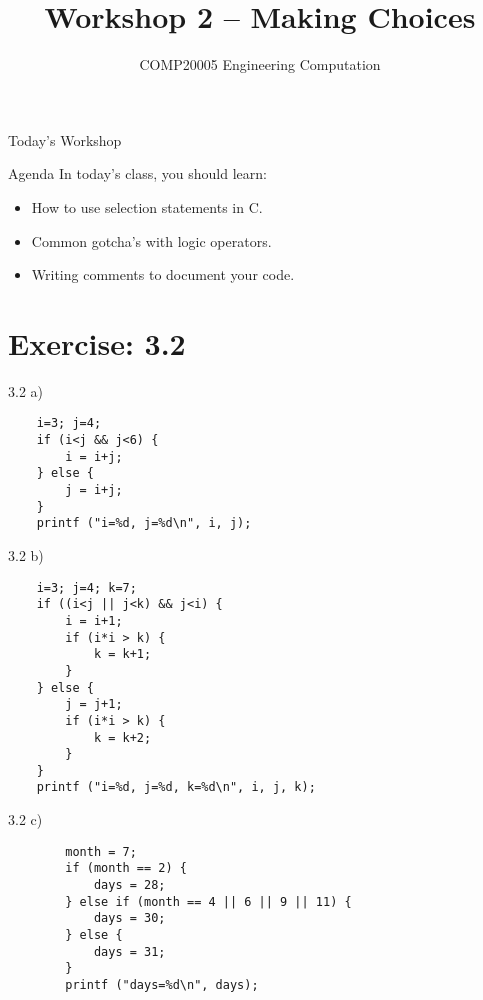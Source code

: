 \documentclass{beamer}
\title{Workshop 2 -- Making Choices}
\author{COMP20005 Engineering Computation}
\institute{The University of Melbourne}
\begin{document}
\begin{frame}
    \titlepage
\end{frame}

\begin{frame}{Today's Workshop}
    \begin{block}{Agenda}
        In today's class, you should learn:
        \begin{itemize}
            \item How to use selection statements in C.
            \item Common gotcha's with logic operators.
            \item Writing comments to document your code.
        \end{itemize}
    \end{block}
\end{frame}

\section{Exercise: 3.2}

\begin{frame}[fragile]{3.2 a)}
    \begin{verbatim}
    i=3; j=4;
    if (i<j && j<6) {
        i = i+j;
    } else {
        j = i+j;
    }
    printf ("i=%d, j=%d\n", i, j);
    \end{verbatim}
\end{frame}

\begin{frame}[fragile]{3.2 b)}
    \begin{verbatim}
    i=3; j=4; k=7;
    if ((i<j || j<k) && j<i) {
        i = i+1;
        if (i*i > k) {
            k = k+1;
        }
    } else {
        j = j+1;
        if (i*i > k) {
            k = k+2;
        }
    }
    printf ("i=%d, j=%d, k=%d\n", i, j, k);
    \end{verbatim}
\end{frame}

\begin{frame}[fragile]{3.2 c)}
    \begin{verbatim}
        month = 7;
        if (month == 2) {
            days = 28;
        } else if (month == 4 || 6 || 9 || 11) {
            days = 30;
        } else {
            days = 31;
        }
        printf ("days=%d\n", days);
    \end{verbatim}
\end{frame}
\end{document}
